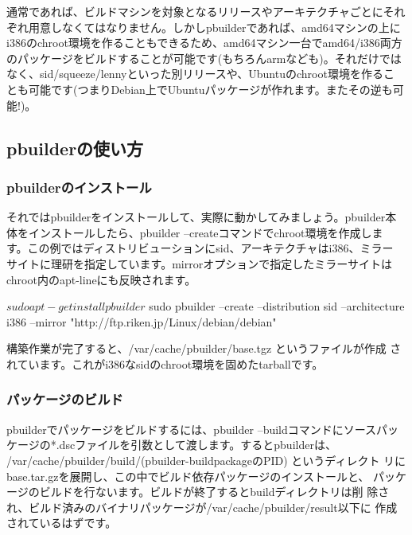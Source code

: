 \documentclass[mingoth,a4paper]{jsarticle}
\begin{document}
通常であれば、ビルドマシンを対象となるリリースやアーキテクチャごとにそれ
ぞれ用意しなくてはなりません。しかしpbuilderであれば、amd64マシンの上に
i386のchroot環境を作ることもできるため、amd64マシン一台でamd64/i386両方
のパッケージをビルドすることが可能です(もちろんarmなども)。それだけでは
なく、sid/squeeze/lennyといった別リリースや、Ubuntuのchroot環境を作るこ
とも可能です(つまりDebian上でUbuntuパッケージが作れます。またその逆も可
能!)。

\subsection{pbuilderの使い方}

\subsubsection{pbuilderのインストール}

それではpbuilderをインストールして、実際に動かしてみましょう。pbuilder本
体をインストールしたら、pbuilder --createコマンドでchroot環境を作成しま
す。この例ではディストリビューションにsid、アーキテクチャはi386、ミラー
サイトに理研を指定しています。mirrorオプションで指定したミラーサイトは
chroot内のapt-lineにも反映されます。

\begin{commandline}
$ sudo apt-get install pbuilder
$ sudo pbuilder --create --distribution sid --architecture i386 --mirror "http://ftp.riken.jp/Linux/debian/debian"
\end{commandline}

構築作業が完了すると、/var/cache/pbuilder/base.tgz というファイルが作成
されています。これがi386なsidのchroot環境を固めたtarballです。

\subsubsection{パッケージのビルド}

pbuilderでパッケージをビルドするには、pbuilder --buildコマンドにソースパッ
ケージの*.dscファイルを引数として渡します。するとpbuilderは、
/var/cache/pbuilder/build/(pbuilder-buildpackageのPID) というディレクト
リにbase.tar.gzを展開し、この中でビルド依存パッケージのインストールと、
パッケージのビルドを行ないます。ビルドが終了するとbuildディレクトリは削
除され、ビルド済みのバイナリパッケージが/var/cache/pbuilder/result以下に
作成されているはずです。
\end{document}
